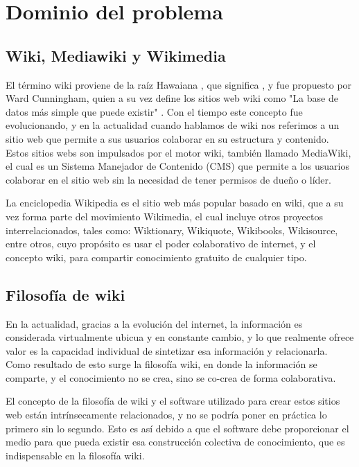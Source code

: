 \section{Dominio del problema}
    \subsection{Wiki, Mediawiki y Wikimedia}

        El término wiki proviene de la raíz Hawaiana , que significa , y fue propuesto por Ward Cunningham, quien a su vez define los sitios web wiki como "La base de datos más simple que puede existir" \cite{WhatIsWiki}. Con el tiempo este concepto fue evolucionando, y en la actualidad cuando hablamos de wiki nos referimos a un sitio web que permite a sus usuarios colaborar en su estructura y contenido. Estos sitios webs son impulsados por el motor wiki, también llamado MediaWiki, el cual es un Sistema Manejador de Contenido (CMS) que permite a los usuarios colaborar en el sitio web sin la necesidad de tener permisos de dueño o líder.

        La enciclopedia Wikipedia es el sitio web más popular basado en wiki, que a su vez forma parte del movimiento Wikimedia, el cual incluye otros proyectos interrelacionados, tales como: Wiktionary, Wikiquote, Wikibooks, Wikisource, entre otros, cuyo propósito es usar el poder colaborativo de internet, y el concepto wiki, para compartir conocimiento gratuito de cualquier tipo.
     
    \subsection{Filosofía de wiki}

        En la actualidad, gracias a la evolución del internet, la información es considerada virtualmente ubicua y en constante cambio, y lo que realmente ofrece valor es la capacidad individual de sintetizar esa información y relacionarla. Como resultado de esto surge la filosofía wiki, en donde la información se comparte, y el conocimiento no se crea, sino se co-crea de forma colaborativa.

        El concepto de la filosofía de wiki y el software utilizado para crear estos sitios web están intrínsecamente relacionados, y no se podría poner en práctica lo primero sin lo segundo. Esto es así debido a que el software debe proporcionar el medio para que pueda existir esa construcción colectiva de conocimiento, que es indispensable en la filosofía wiki.
        
